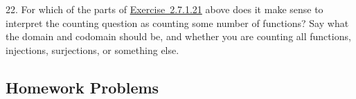 \documentclass[10pt,]{book}
\theoremstyle{plain}
\theoremstyle{definition}
\theoremstyle{definition}
\theoremstyle{definition}
\numberwithin{equation}{section}
\begin{document}
\begin{exerciselist}
\par\smallskip
\item[22.]\hypertarget{exercise-123}{}
            For which of the parts of \hyperlink{exr_cookie-counting}{Exercise~2.7.1.21} above does it make sense to interpret the counting question as counting some number of functions? Say what the domain and codomain should be, and whether you are counting all functions, injections, surjections, or something else.
\par\smallskip
\end{exerciselist}
\typeout{************************************************}
\typeout{************************************************}
\subsection[Homework Problems]{Homework Problems}\label{exercises-11}
\end{document}
